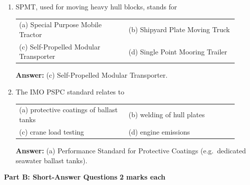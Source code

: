 \documentclass[11pt,a4paper]{article}
\makeatletter
\newcommand{\opts}[4]{%
	\par\smallskip
	\begin{tabular}{@{}p{0.46\linewidth}p{0.46\linewidth}@{}}
		(a) #1 & (b) #2 \\
		(c) #3 & (d) #4 \\
	\end{tabular}\par}
\newcommand{\ans}[1]{%
	\par\smallskip
	{\color{cGreen!50!black}\textbf{Answer:} #1}\par\medskip}
\newcommand{\partheading}[2]{%
	\bigskip
	\begin{tcolorbox}[colback=cAccent!10, colframe=cAccent, boxrule=0.6pt, arc=2pt, left=6pt, top=3pt, bottom=3pt]
		\textbf{\large #1} \hfill \textbf{#2}
	\end{tcolorbox}}
\makeatother
\begin{document}
\begin{enumerate}
		\item SPMT, used for moving heavy hull blocks, stands for
		\opts{Special Purpose Mobile Tractor}{Shipyard Plate Moving Truck}{Self-Propelled Modular Transporter}{Single Point Mooring Trailer}
		\ans{(c) Self-Propelled Modular Transporter.}

		\item The IMO PSPC standard relates to
		\opts{protective coatings of ballast tanks}{welding of hull plates}{crane load testing}{engine emissions}
		\ans{(a) Performance Standard for Protective Coatings (e.g.\ dedicated seawater ballast tanks).}

	\end{enumerate}

	\partheading{Part B: Short-Answer Questions}{2 marks each}
\end{document}
